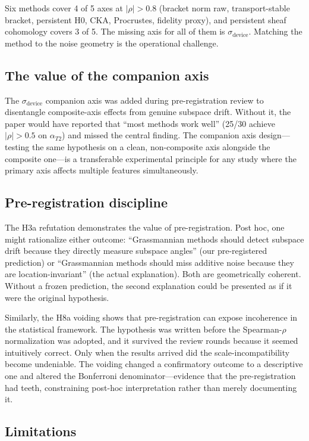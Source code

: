 \documentclass[11pt]{article}
\begin{document}
Six methods cover 4 of 5 axes at $|\rho| > 0.8$ (bracket norm raw,
transport-stable bracket, persistent H0, CKA, Procrustes, fidelity
proxy), and persistent sheaf cohomology covers 3 of 5.  The missing
axis for all of them is $\sigma_\text{device}$.  Matching the method
to the noise geometry is the operational challenge.

\subsection{The value of the companion axis}

The $\sigma_\text{device}$ companion axis was added during
pre-registration review to disentangle composite-axis effects from
genuine subspace drift.  Without it, the paper would have reported that
``most methods work well'' (25/30 achieve $|\rho| > 0.5$ on
$\alpha_{T2}$) and missed the central finding.  The companion axis design---testing the same
hypothesis on a clean, non-composite axis alongside the composite
one---is a transferable experimental principle for any study where the
primary axis affects multiple features simultaneously.

\subsection{Pre-registration discipline}

The H3a refutation demonstrates the value of pre-registration.  Post
hoc, one might rationalize either outcome: ``Grassmannian methods should
detect subspace drift because they directly measure subspace angles''
(our pre-registered prediction) or ``Grassmannian methods should miss
additive noise because they are location-invariant'' (the actual
explanation).  Both are geometrically coherent.  Without a frozen
prediction, the second explanation could be presented as if it were
the original hypothesis.

Similarly, the H8a voiding shows that pre-registration can expose
incoherence in the statistical framework.  The hypothesis was written
before the Spearman-$\rho$ normalization was adopted, and it survived
the review rounds because it seemed intuitively correct.  Only when the
results arrived did the scale-incompatibility become undeniable.  The
voiding changed a confirmatory outcome to a descriptive one and altered
the Bonferroni denominator---evidence that the pre-registration had
teeth, constraining post-hoc interpretation rather than merely
documenting it.

\subsection{Limitations}
\end{document}
